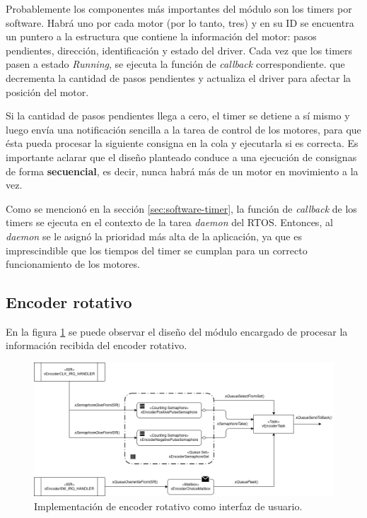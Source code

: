 \documentclass{IEEEtran}
\begin{document}
Probablemente los componentes más importantes del módulo son los timers por software. Habrá uno por cada motor (por lo tanto, tres) y en su ID se encuentra un puntero a la estructura que contiene la información del motor: pasos pendientes, dirección, identificación y estado del driver. Cada vez que los timers pasen a estado \textit{Running}, se ejecuta la función de \textit{callback} correspondiente. que decrementa la cantidad de pasos pendientes y actualiza el driver para afectar la posición del motor. 

Si la cantidad de pasos pendientes llega a cero, el timer se detiene a sí mismo y luego envía una notificación sencilla a la tarea de control de los motores, para que ésta pueda procesar la siguiente consigna en la cola y ejecutarla si es correcta. Es importante aclarar que el diseño planteado conduce a una ejecución de consignas de forma \textbf{secuencial}, es decir, nunca habrá más de un motor en movimiento a la vez.

Como se mencionó en la sección \ref{sec:software-timer}, la función de \textit{callback} de los timers se ejecuta en el contexto de la tarea \textit{daemon} del RTOS. Entonces, al \textit{daemon} se le asignó la prioridad más alta de la aplicación, ya que es imprescindible que los tiempos del timer se cumplan para un correcto funcionamiento de los motores.

\subsection{Encoder rotativo}
\label{sec:encoder}

En la figura \ref{fig:diagrama-encoder} se puede observar el diseño del módulo encargado de procesar la información recibida del encoder rotativo.

\begin{figure}[ht]
    \centering
    \includegraphics[scale=0.5]{../diagrama_encoder.png}
    \caption{Implementación de encoder rotativo como interfaz de usuario.}
    \label{fig:diagrama-encoder}
\end{figure}
\end{document}
